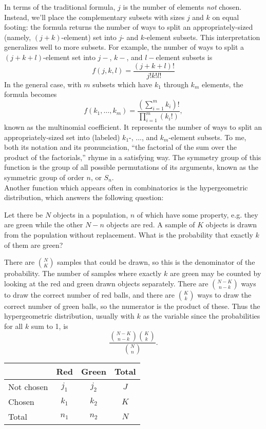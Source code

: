 \documentclass{article}
\begin{document}
In terms of the traditional formula,
$j$ is the number of elements \textit{not} chosen.
Instead, we'll place the complementary subsets
with sizes $j$ and $k$ on equal footing: the formula returns
the number of ways to split an appropriately-sized (namely, $(j+k)$-element) set
into $j$- and $k$-element subsets.
This interpretation generalizes well to more subsets.
For example, the number of ways to split a $(j+k+l)$-element set
into $j-$, $k-$, and $l-$element subsets is
\[f(j, k, l) = \frac{(j+k+l)!}{j!k!l!}\]
In the general case, with $m$ subsets which have $k_1$ through $k_m$ elements,
the formula becomes
\[f(k_1, \ldots, k_m) = \frac{\left(\sum\limits_{i=1}^{m}k_i\right)!}{\prod\limits_{i=1}^{m}\left(k_i!\right)},\]
known as the multinomial coefficient.
It represents
the number of ways to split an appropriately-sized set
into (labeled) $k_1$-, ..., and $k_m$-element subsets.
To me, both its notation and its pronunciation,
``the factorial of the sum over the product of the factorials,''
rhyme in a satisfying way.
The symmetry group of this function
is the group of all possible permutations of its arguments,
known as the symmetric group of order $n$, or $S_n$.\\

Another function which appears often in combinatorics
is the hypergeometric distribution,
which answers the following question:
\begin{center}
Let there be $N$ objects in a population,
$n$ of which have some property,
e.g. they are green while the other $N-n$ objects are red.
A sample of $K$ objects is drawn from the population without replacement.
What is the probability that exactly $k$ of them are green?
\end{center}
There are $\binom{N}{K}$ samples that could be drawn,
so this is the denominator of the probability.
The number of samples where exactly $k$ are green
may be counted by looking at the red and green drawn objects separately.
There are $\binom{N-K}{n-k}$ ways to draw the correct number of red balls,
and there are $\binom{K}{k}$ ways to draw the correct number of green balls,
so the numerator is the product of these.
Thus the hypergeometric distribution,
usually with $k$ as the variable since the probabilities for all $k$ sum to 1, is
\[\frac{{N-K \choose n-k}{K \choose k}}{{N \choose n}}.\]

\begin{tabular}{|l|c|c|c|}
  \hline
  & Red & Green & Total \\ \hline
  Not chosen & $j_1$ & $j_2$ & $J$ \\ \hline
  Chosen & $k_1$ & $k_2$ & $K$ \\ \hline
  Total & $n_1$ & $n_2$ & $N$ \\ \hline
\end{tabular}
\end{document}
